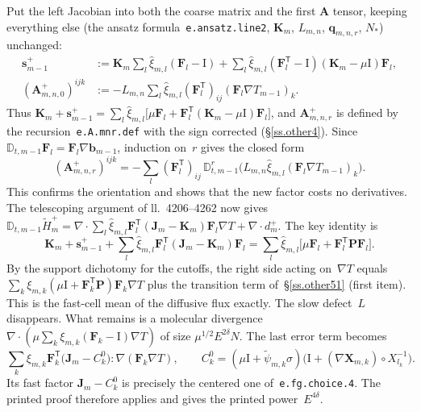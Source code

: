 \documentclass[11pt]{amsart}
\makeatletter
\newcommand{\Id}{\mathrm{I}}
\newcommand{\K}{\mathbf{K}}
\newcommand{\J}{\mathbf{J}}
\newcommand{\F}{\mathbf{F}}
\newcommand{\s}{\mathbf{s}}
\newcommand{\A}{\mathbf{A}}
\renewcommand{\P}{\mathbf{P}}
\newcommand{\Chi}{\mathbf{X}}
\newcommand{\DD}{\mathbb{D}}
\newcommand{\Lns}[1]{ll.~#1}
\newcommand{\lab}[1]{\texttt{#1}}
\renewcommand\paragraph{\@startsection{paragraph}{4}{\z@}{.5\linespacing\@plus.2\linespacing}{-.5em}{\normalfont\bfseries}}
\theoremstyle{remark}
\makeatother
\begin{document}
\paragraph{Repair.}
Put the left Jacobian into both the coarse matrix and the first $\A$ tensor, keeping everything else (the ansatz formula~\lab{e.ansatz.line2}, $\K_m$, $L_{m,n}$, $\mathbf q_{m,n,r}$, $N_*$) unchanged:
\begin{align*}
\s^+_{m-1}&:=\K_m\sum_l\hat\xi_{m,l}(\F_l-\Id)+\sum_l\hat\xi_{m,l}(\F_l^{\mathsf T}-\Id)(\K_m-\mu\Id)\F_l ,
\\
(\A^+_{m,n,0})^{ijk}&:=-L_{m,n}\sum_l\hat\xi_{m,l}(\F_l^{\mathsf T})_{ij}(\F_l\nabla T_{m-1})_k .
\end{align*}
Thus $\K_m+\s^+_{m-1}=\sum_l\hat\xi_{m,l}\bigl[\mu\F_l+\F_l^{\mathsf T}(\K_m-\mu\Id)\F_l\bigr]$, and $\A^+_{m,n,r}$ is defined by the recursion~\lab{e.A.mnr.def} with the sign corrected (\S\ref{ss.other4}). Since $\DD_{t,m-1}\F_l=\F_l\nabla\mathbf b_{m-1}$, induction on~$r$ gives the closed form
\begin{equation*}
(\A^+_{m,n,r})^{ijk}=-\sum_l(\F_l^{\mathsf T})_{ij}\,\DD_{t,m-1}^r\bigl(L_{m,n}\hat\xi_{m,l}(\F_l\nabla T_{m-1})_k\bigr).
\end{equation*}
This confirms the orientation and shows that the new factor costs no derivatives. The telescoping argument of \Lns{4206--4262} now gives $\DD_{t,m-1}\widetilde H^+_m=\nabla\cdot\sum_l\hat\xi_{m,l}\F_l^{\mathsf T}(\J_m-\K_m)\F_l\nabla T+\nabla\cdot d^+_m$. The key identity is
\begin{equation*}
\K_m+\s^+_{m-1}+\sum_l\hat\xi_{m,l}\F_l^{\mathsf T}(\J_m-\K_m)\F_l=\sum_l\hat\xi_{m,l}\bigl[\mu\F_l+\F_l^{\mathsf T}\P\F_l\bigr].
\end{equation*}
By the support dichotomy for the cutoffs, the right side acting on~$\nabla T$ equals $\sum_k\xi_{m,k}(\mu\Id+\F_k^{\mathsf T}\P)\F_k\nabla T$ plus the transition term of~\S\ref{ss.other51} (first item). This is the fast-cell mean of the diffusive flux exactly. The slow defect~$L$ disappears. What remains is a molecular divergence $\nabla\cdot(\mu\sum_k\xi_{m,k}(\F_k-\Id)\nabla T)$ of size $\mu^{1/2}E^{2\delta}N$. The last error term becomes
\begin{equation*}
\sum_k\xi_{m,k}\F_k^{\mathsf T}\bigl(\J_m-C^0_k\bigr):\nabla(\F_k\nabla T),\qquad C^0_k=(\mu\Id+\tilde\psi_{m,k}\sigma)\bigl(\Id+(\nabla\Chi_{m,k})\circ X_{l_k}^{-1}\bigr).
\end{equation*}
Its fast factor $\J_m-C^0_k$ is precisely the centered one of~\lab{e.fg.choice.4}. The printed proof therefore applies and gives the printed power~$E^{4\delta}$.
\end{document}
